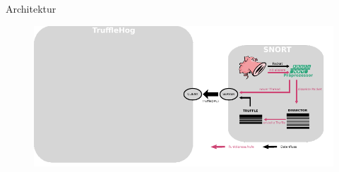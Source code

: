 \begin{frame}{Architektur}
    \begin{figure}
    	\centering
    	\includegraphics[width=\textwidth]{./images/arch/7.pdf}
    \end{figure}
\end{frame}
